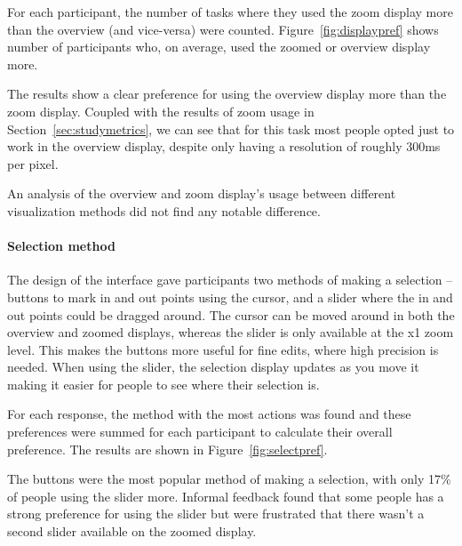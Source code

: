 For each participant, the number of tasks where they used the zoom display more
than the overview (and vice-versa) were counted. Figure~\ref{fig:displaypref}
shows number of participants who, on average, used the zoomed or overview
display more.

The results show a clear preference for using the overview display more than
the zoom display. Coupled with the results of zoom usage in
Section~\ref{sec:studymetrics}, we can see that for this task most people opted
just to work in the overview display, despite only having a resolution of
roughly 300ms per pixel.

An analysis of the overview and zoom display's usage between different
visualization methods did not find any notable difference.

\paragraph{Selection method}
The design of the interface gave participants two methods of making a selection
-- buttons to mark in and out points using the cursor, and a slider where the
in and out points could be dragged around. The cursor can be moved around in
both the overview and zoomed displays, whereas the slider is only available at
the x1 zoom level. This makes the buttons more useful for fine edits, where
high precision is needed. When using the slider, the selection display updates
as you move it making it easier for people to see where their selection is.

For each response, the method with the most actions was found and these
preferences were summed for each participant to calculate their overall
preference. The results are shown in Figure~\ref{fig:selectpref}.

The buttons were the most popular method of making a selection, with only 17\%
of people using the slider more. Informal feedback found that some people has a
strong preference for using the slider but were frustrated that there wasn't a
second slider available on the zoomed display.

